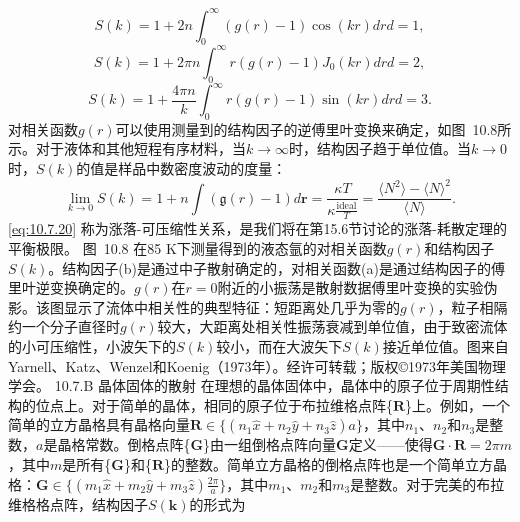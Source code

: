 \begin{equation}\tag{10.7.17}\label{eq:10.7.17}
S ( k ) = 1 + 2 n \int _ { 0 } ^{\infty} ( g ( r ) - 1 ) \cos ( k r ) d r  d = 1 ,
\end{equation}
\begin{equation}\tag{10.7.18}\label{eq:10.7.18}
S ( k ) = 1 + 2 \pi n \int _ { 0 } ^{\infty} r ( g ( r ) - 1 ) J _ { 0 } ( k r ) d r  d = 2 ,
\end{equation}
\begin{equation}\tag{10.7.19}\label{eq:10.7.19}
S ( k ) = 1 + \frac { 4 \pi n } { k } \int _ { 0 } ^{\infty} r ( g ( r ) - 1 ) \sin ( k r ) d r  d = 3 .
\end{equation}
对相关函数\(g(r)\)可以使用测量到的结构因子的逆傅里叶变换来确定，如图~10.8所示。对于液体和其他短程有序材料，当\(k \to \infty\)时，结构因子趋于单位值。当\(k \to 0\)时，\(S(k)\)的值是样品中数密度波动的度量：
\begin{equation}\tag{10.7.20}\label{eq:10.7.20}
\operatorname* { l i m } _ { k \to 0 } S ( k ) = 1 + n \int ( { \mathfrak { g } } ( r ) - 1 ) d { \mathbf { r } } = { \frac { \kappa T } { \kappa { \frac { \mathrm { i d e a l } } { T } } } } = { \frac { \langle N ^{2} \rangle - \langle N \rangle ^{2} } { \langle N \rangle } } .
\end{equation}
\autoref{eq:10.7.20} 称为涨落-可压缩性关系，是我们将在第15.6节讨论的涨落-耗散定理的平衡极限。
图~10.8 在85 K下测量得到的液态氩的对相关函数\(g(r)\)和结构因子\(S(k)\)。结构因子(b)是通过中子散射确定的，对相关函数(a)是通过结构因子的傅里叶逆变换确定的。\(g(r)\)在\(r=0\)附近的小振荡是散射数据傅里叶变换的实验伪影。该图显示了流体中相关性的典型特征：短距离处几乎为零的\(g(r)\)，粒子相隔约一个分子直径时\(g(r)\)较大，大距离处相关性振荡衰减到单位值，由于致密流体的小可压缩性，小波矢下的\(S(k)\)较小，而在大波矢下\(S(k)\)接近单位值。图来自Yarnell、Katz、Wenzel和Koenig（1973年）。经许可转载；版权©1973年美国物理学会。
10.7.B 晶体固体的散射
在理想的晶体固体中，晶体中的原子位于周期性结构的位点上。对于简单的晶体，相同的原子位于布拉维格点阵\{\(\mathbf{R}\)\}上。例如，一个简单的立方晶格具有晶格向量\(\mathbf{R} \in \{(n_1 \hat{x} + n_2 \hat{y} + n_3 \hat{z}) a\}\)，其中\(n_1\)、\(n_2\)和\(n_3\)是整数，\(a\)是晶格常数。倒格点阵\{\(\mathbf{G}\)\}由一组倒格点阵向量\(\mathbf{G}\)定义——使得\(\mathbf{G} \cdot \mathbf{R} = 2\pi m\)，其中\(m\)是所有\{\(\mathbf{G}\)\}和\{\(\mathbf{R}\)\}的整数。简单立方晶格的倒格点阵也是一个简单立方晶格：\(\mathbf{G} \in \{(m_1 \hat{x} + m_2 \hat{y} + m_3 \hat{z}) \frac{2\pi}{a}\}\)，其中\(m_1\)、\(m_2\)和\(m_3\)是整数。对于完美的布拉维格格点阵，结构因子\(S(\mathbf{k})\)的形式为
